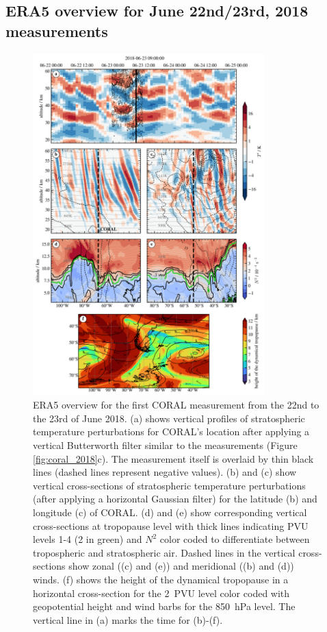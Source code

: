 \subsection*{ERA5 overview for June 22nd/23rd, 2018 measurements}
%
\begin{figure}[tbp]
    \centering
    \includegraphics[width=0.8\textwidth]{figures_lidar/era5_trop_strat_33.png}
    \caption{ERA5 overview for the first CORAL measurement from the 22nd to the 23rd of June 2018. (a) shows vertical profiles of stratospheric temperature perturbations for CORAL's location after applying a vertical Butterworth filter similar to the measurements (Figure \ref{fig:coral_2018}c). The measurement itself is overlaid by thin black lines (dashed lines represent negative values). (b) and (c) show vertical cross-sections of stratospheric temperature perturbations (after applying a horizontal Gaussian filter) for the latitude (b) and longitude (c) of CORAL. (d) and (e) show corresponding vertical cross-sections at tropopause level with thick lines indicating PVU levels 1-4 (2 in green) and $N^2$ color coded to differentiate between tropospheric and stratospheric air. Dashed lines in the vertical cross-sections show zonal ((c) and (e)) and meridional ((b) and (d)) winds. (f) shows the height of the dynamical tropopause in a horizontal cross-section for the \SI{2}{PVU} level color coded with geopotential height and wind barbs for the \SI{850}{hPa} level. The vertical line in (a) marks the time for (b)-(f).}
    \label{fig:era5_2018}
\end{figure}
